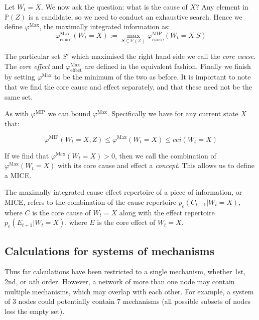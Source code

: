 Let $W_t = X$. We now ask the question: what is the cause of $X$? Any element in $\mathbb{P}(Z)$ is a candidate, so we need to conduct an exhaustive search. Hence we define $\varphi^{\text{Max}}$, the maximally integrated information as: 
\begin{equation}
\label{def:core_cause}
\varphi^{\text{Max}}_{\text{cause}}(W_t = X):=\max \limits_{S \in \mathbb{P}(Z)}\varphi^{\text{MIP}}_{\text{cause}}(W_t = X|S)
\end{equation}

The particular set $S'$ which maximised the right hand side we call the \textit{core cause}. The \textit{core effect} and $\varphi^{\text{Max}}_{\text{effect}}$ are defined in the equivalent fashion. Finally we finish  by setting $\varphi^{\text{Max}}$ to be the minimum of the two as before. It is important to note that we find the core cause and effect separately, and that these need not be the same set.

As with $\varphi^{\text{MIP}}$ we can bound $\varphi^{\text{Max}}$. Specifically we have for any current state $X$ that:

\begin{equation}
\label{eq:bound_phimax}
\varphi^{\text{MIP}}(W_t = X, Z) \leq \varphi^{\text{Max}}(W_t = X)\leq cei(W_t = X)
\end{equation}

If we find that $\varphi^{\text{Max}}(W_t = X)>0$, then we call the combination of $\varphi^{\text{Max}}(W_t = X)$ with its core cause and effect a \textit{concept}. This allows us to define a MICE.

\begin{definition}
	{The maximally integrated cause effect repertoire of a piece of information, or MICE, refers to the combination of the cause repertoire $p_c(C_{t-1}|W_t = X)$, where $C$ is the core cause of $W_t=X$ along with the effect repertoire $p_e(E_{t+1}|W_t = X)$, where $E$ is the core effect of $W_t = X$.}
\end{definition}

\subsection{Calculations for systems of mechanisms}
Thus far calculations have been restricted to a single mechanism, whether 1st, 2nd, or $n$th order. However, a network of more than one node may contain multiple mechanisms, which may overlap with each other. For example, a system of 3 nodes could potentially contain 7 mechanisms (all possible subsets of nodes less the empty set).

